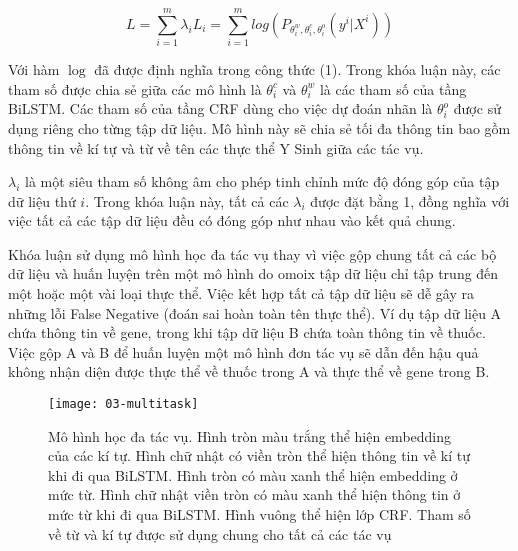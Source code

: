 \documentclass[../main.tex]{subfiles}
\begin{document}
\begin{equation}
L = \sum^{m}_{i=1} \lambda_{i} L_{i} = \sum^{m}_{i=1} log(P_{\theta^{w}_{i}, \theta^{c}_{i}, \theta^{o}_{i}} (y^{i} | X^{i})) \nonumber
\end{equation}

Với hàm $\log$ đã được định nghĩa trong công thức (1). Trong khóa luận này, các tham số được chia sẻ giữa các mô hình là $\theta^{c}_{i}$ và $\theta^{w}_{i}$ là các tham số của tầng BiLSTM. Các tham số của tầng CRF dùng cho việc dự đoán nhãn là $\theta^{o}_{i}$ được sử dụng riêng cho từng tập dữ liệu. Mô hình này sẽ chia sẻ tối đa thông tin bao gồm thông tin về kí tự và từ về tên các thực thể Y Sinh giữa các tác vụ. 

$ \lambda_{i}$ là một siêu tham số không âm cho phép tinh chỉnh mức độ đóng góp của tập dữ liệu thứ $i$. Trong khóa luận này, tất cả các $ \lambda_{i}$ được đặt bằng 1, đồng nghĩa với việc tất cả các tập dữ liệu đều có đóng góp như nhau vào kết quả chung. 

Khóa luận sử dụng mô hình học đa tác vụ thay vì việc gộp chung tất cả các bộ dữ liệu và huấn luyện trên một mô hình do omoix tập dữ liệu chỉ tập trung đến một hoặc một vài loại thực thể. Việc kết hợp tất cả tập dữ liệu sẽ dễ gây ra những lỗi False Negative (đoán sai hoàn toàn tên thực thể). Ví dụ tập dữ liệu A chứa thông tin về gene, trong khi tập dữ liệu B chứa toàn thông tin về thuốc. Việc gộp A và B để huấn luyện một mô hình đơn tác vụ sẽ dẫn đến hậu quả không nhận diện được thực thể về thuốc trong A và thực thể về gene trong B. 

\begin{figure}[h]
\centering
\texttt{[image: 03-multitask]}
\caption{Mô hình học đa tác vụ. Hình tròn màu trắng thể hiện embedding của các kí tự. Hình chữ nhật có viền tròn thể hiện thông tin về kí tự khi đi qua BiLSTM. Hình tròn có màu xanh thể hiện embedding ở mức từ. Hình chữ nhật viền tròn có màu xanh thể hiện thông tin ở mức từ khi đi qua BiLSTM. Hình vuông thể hiện lớp CRF. Tham số về từ và kí tự được sử dụng chung cho tất cả các tác vụ}
\end{figure}
\end{document}

